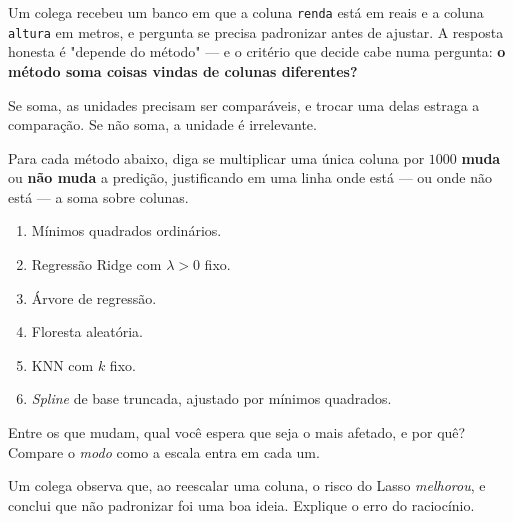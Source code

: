 Um colega recebeu um banco em que a coluna \texttt{renda} está em reais e a coluna
\texttt{altura} em metros, e pergunta se precisa padronizar antes de ajustar. A
resposta honesta é "depende do método" --- e o critério que decide cabe numa
pergunta: \textbf{o método soma coisas vindas de colunas diferentes?}

Se soma, as unidades precisam ser comparáveis, e trocar uma delas estraga a
comparação. Se não soma, a unidade é irrelevante.
\begin{itens}
  \item {} Para cada método abaixo, diga se multiplicar uma
        única coluna por $1000$ \textbf{muda} ou \textbf{não muda} a predição,
        justificando em uma linha onde está --- ou onde não está --- a soma sobre
        colunas.
        \begin{enumerate}[label=(\roman*),leftmargin=1.0cm,nosep]
          \item Mínimos quadrados ordinários.
          \item Regressão Ridge com $\lambda>0$ fixo.
          \item Árvore de regressão.
          \item Floresta aleatória.
          \item KNN com $k$ fixo.
          \item \emph{Spline} de base truncada, ajustado por mínimos quadrados.
        \end{enumerate}
  \item {} Entre os que mudam, qual você espera que seja o mais afetado, e
        por quê? Compare o \emph{modo} como a escala entra em cada um.
  \item {} Um colega observa que, ao reescalar uma coluna, o risco do Lasso
        \emph{melhorou}, e conclui que não padronizar foi uma boa ideia. Explique
        o erro do raciocínio.
\end{itens}

